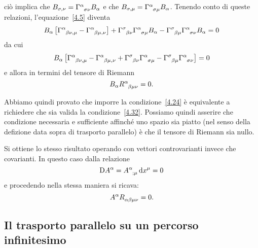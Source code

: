 ciò implica che $B_{\sigma,\nu}= \tensor{\Gamma}{^{\alpha}_{\sigma \nu}}
B_{\alpha}$ e che $B_{\sigma,\mu}= \tensor{\Gamma}{^{\alpha}_{\sigma \mu}}
B_{\alpha}$.  Tenendo conto di queste relazioni, l'equazione~\eqref{4.5} diventa
\begin{equation}
  B_{\alpha}
  \left[ \tensor{\Gamma}{^{\alpha}_{\beta \nu ,\mu}} -
    \tensor{\Gamma}{^{\alpha}_{\beta \mu ,\nu}} \right] +
  \tensor{\Gamma}{^{\sigma}_{\beta \nu}} \tensor{\Gamma}{^{\alpha}_{\sigma \mu}}
  B_{\alpha} - \tensor{\Gamma}{^{\sigma}_{\beta \mu}}
  \tensor{\Gamma}{^{\alpha}_{\sigma \nu}} B_{\alpha} =0
\end{equation}
da cui
\begin{equation}
  B_{\alpha} \left[
    \tensor{\Gamma}{^{\alpha}_{\beta \nu, \mu}} -
    \tensor{\Gamma}{^{\alpha}_{\beta \mu, \nu}} +
    \tensor{\Gamma}{^{\sigma}_{\beta \nu}} \tensor{\Gamma}{^{\alpha}_{\sigma
        \mu}} - \tensor{\Gamma}{^{\sigma}_{\beta \mu}}
    \tensor{\Gamma}{^{\alpha}_{\sigma \nu}} \right] =0
 \end{equation}
e allora in termini del tensore di Riemann
\begin{equation}
  \label{4.32}
  B_{\alpha} \tensor{R}{^{\alpha}_{\beta \mu \nu}} = 0.
\end{equation}

Abbiamo quindi provato che imporre la condizione~\eqref{4.24} è equivalente a
richiedere che sia valida la condizione~\eqref{4.32}.  Possiamo quindi asserire
che condizione necessaria e sufficiente affinché uno spazio sia piatto (nel
senso della defizione data sopra di trasporto parallelo) è che il tensore di
Riemann sia nullo.

Si ottiene lo stesso risultato operando con vettori controvarianti invece che
covarianti. In questo caso dalla relazione
\begin{equation}
  \cdd A^{\alpha} = \tensor{A}{^{\alpha}_{;\mu}} \dd x^{\mu} =0
\end{equation}
e procedendo nella stessa maniera si ricava:
\begin{equation}
  A^{\alpha} \tensor{R}{_{\alpha \beta \mu \nu}} = 0.
\end{equation}

\subsection{Il trasporto parallelo su un percorso infinitesimo}
\label{sec:trasporto-parallelo-percorso-infinitesimo}

